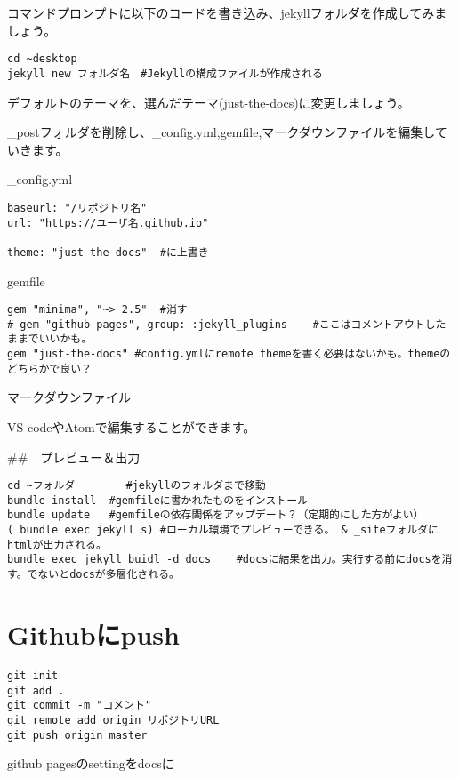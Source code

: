 \documentclass[
]{book}
\begin{document}
コマンドプロンプトに以下のコードを書き込み、jekyllフォルダを作成してみましょう。

\begin{verbatim}
cd ~desktop
jekyll new フォルダ名　#Jekyllの構成ファイルが作成される
\end{verbatim}

デフォルトのテーマを、選んだテーマ(just-the-docs)に変更しましょう。

\_postフォルダを削除し、\_config.yml,gemfile,マークダウンファイルを編集していきます。

\_config.yml

\begin{verbatim}
baseurl: "/リポジトリ名" 
url: "https://ユーザ名.github.io" 

theme: "just-the-docs"	#に上書き
\end{verbatim}

gemfile

\begin{verbatim}
gem "minima", "~> 2.5"	#消す
# gem "github-pages", group: :jekyll_plugins	#ここはコメントアウトしたままでいいかも。
gem "just-the-docs"	#config.ymlにremote themeを書く必要はないかも。themeのどちらかで良い？
\end{verbatim}

マークダウンファイル

VS codeやAtomで編集することができます。

\#\#　プレビュー＆出力

\begin{verbatim}
cd ~フォルダ 		#jekyllのフォルダまで移動
bundle install	#gemfileに書かれたものをインストール
bundle update 	#gemfileの依存関係をアップデート？（定期的にした方がよい）
( bundle exec jekyll s)	#ローカル環境でプレビューできる。 & _siteフォルダにhtmlが出力される。
bundle exec jekyll buidl -d docs	#docsに結果を出力。実行する前にdocsを消す。でないとdocsが多層化される。
\end{verbatim}

\hypertarget{githubux306bpush}{%
\section{Githubにpush}\label{githubux306bpush}}

\begin{verbatim}
git init
git add .
git commit -m "コメント"
git remote add origin リポジトリURL
git push origin master
\end{verbatim}

github pagesのsettingをdocsに
\end{document}
